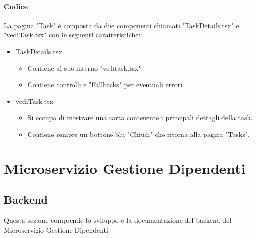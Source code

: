 \documentclass{report}
\begin{document}
\subsubsection*{Codice}
La pagina "Task" è composta da due componenti chiamati "TaskDetails.tsx" e "vediTask.tsx" con le seguenti caratteristiche:
\begin{itemize}
	\item TaskDetails.tsx
	\begin{itemize}
		\item Contiene al suo interno "veditask.tsx"
		\item Contiene controlli e "Fallbacks" per eventuali errori
	\end{itemize}
	\item vediTask.tsx
	\begin{itemize}
		\item Si occupa di mostrare una carta contenente i principali dettagli della task.
		\item Contiene sempre un bottone blu "Chiudi" che ritorna alla pagina "Tasks".
	\end{itemize}
\end{itemize}



\chapter{Microservizio Gestione Dipendenti}
\section{Backend}

Questa sezione comprende lo sviluppo e la documentazione del backend del Microservizio Gestione Dipendenti
\end{document}
